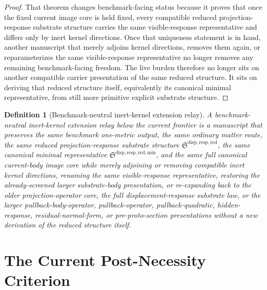 \documentclass[11pt]{article}
\newcommand{\ReducedStructure}{\mathfrak S^{\mathrm{disp,resp,red}}}
\newcommand{\MinimalReducedStructure}{\mathfrak S^{\mathrm{disp,resp,red,min}}}
\newtheorem{definition}{Definition}
\begin{document}
\begin{proof}
That theorem changes benchmark-facing status because it proves that once the fixed current image core is held fixed, every compatible reduced projection-response substrate structure carries the same visible-response representative and differs only by inert kernel directions. Once that uniqueness statement is in hand, another manuscript that merely adjoins kernel directions, removes them again, or reparameterizes the same visible-response representative no longer removes any remaining benchmark-facing freedom. The live burden therefore no longer sits on another compatible carrier presentation of the same reduced structure. It sits on deriving that reduced structure itself, equivalently its canonical minimal representative, from still more primitive explicit substrate structure.
\end{proof}

\begin{definition}[Benchmark-neutral inert-kernel extension relay]
A \emph{benchmark-neutral inert-kernel extension relay below the current frontier} is a manuscript that preserves the same benchmark one-metric output, the same ordinary matter route, the same reduced projection-response substrate structure \(\ReducedStructure\), the same canonical minimal representative \(\MinimalReducedStructure\), and the same full canonical current-body image core while merely adjoining or removing compatible inert kernel directions, renaming the same visible-response representative, restoring the already-screened larger substrate-body presentation, or re-expanding back to the older projection-operator core, the full displacement-response substrate law, or the larger pullback-body-operator, pullback-operator, pullback-quadratic, hidden-response, residual-normal-form, or pre-proto-section presentations without a new derivation of the reduced structure itself.
\end{definition}

\section{The Current Post-Necessity Criterion}
\end{document}
